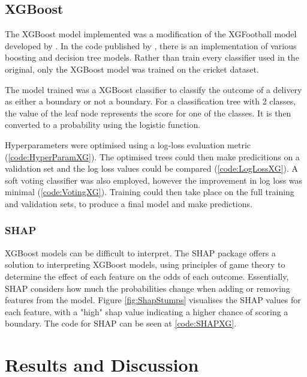 \documentclass[12pt,a4paper]{report}
\theoremstyle{definition}
\begin{document}
\section{XGBoost}

The XGBoost \citep{Chen2016} model implemented was a modification of the XGFootball model developed by \citet{Blumberg2020}.
In the code published by \citet{Blumberg2020}, there is an implementation of various boosting and decision tree models.
Rather than train every classifier used in the original, only the XGBoost model was trained on the cricket dataset.

The model trained was a XGBoost classifier to classify the outcome of a delivery as either a boundary or not a boundary.
For a classification tree with 2 classes, the value of the leaf node represents the score for one of the classes.
It is then converted to a probability using the logistic function.

Hyperparameters were optimised using a log-loss evaluation metric (\ref{code:HyperParamXG}).
The optimised trees could then make predicitions on a validation set and the log loss values could be compared (\ref{code:LogLossXG}).
A soft voting classifier was also employed, however the improvement in log loss was minimal (\ref{code:VotingXG}).
Training could then take place on the full training and validation sets, to produce a final model and make predictions.

\subsection{SHAP}

XGBoost models can be difficult to interpret. 
The SHAP package offers a solution to interpreting XGBoost models, using principles of game theory to determine the effect of each feature on the odds of each outcome.
Essentially, SHAP considers how much the probabilities change when adding or removing features from the model.
Figure \ref{fig:ShapStumps} visualises the SHAP values for each feature, with a "high" shap value indicating a higher chance of scoring a boundary.
The code for SHAP can be seen at \ref{code:SHAPXG}.

\chapter{Results and Discussion}
\end{document}
